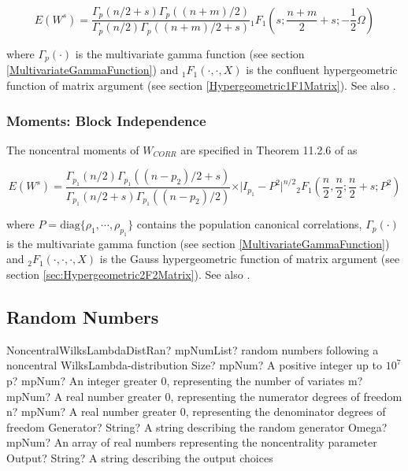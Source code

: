 \begin{equation}
	E(W^s) = \frac{\Gamma_p(n/2 + s)\Gamma_p((n + m)/2)}{\Gamma_p(n/2)\Gamma_p((n + m)/2 + s)} {}_1F_1\left(s ;\frac{n + m}{2}+ s ; -\frac{1}{2}\Omega\right)
\end{equation}

where $\Gamma_p(\cdot)$ is the multivariate gamma function (see section \ref{MultivariateGammaFunction}) and ${}_1F_1(\cdot,\cdot,X)$ is the confluent hypergeometric function of matrix argument (see section \ref{Hypergeometric1F1Matrix}). See also \cite{Butler_Wood_2002}.





\subsubsection{Moments: Block Independence}
The noncentral moments of $W_{CORR}$ are specified in Theorem 11.2.6 of \cite{Muirhead_1982} as

\begin{equation}
	E(W^s) = \frac{\Gamma_{p_1}(n/2)\Gamma_{p_1}((n - p_2)/2 + s)}{\Gamma_{p_1}(n/2+s)\Gamma_{p_1}((n-p_2)/2)} \times \vert I_{p_1}-P^2 \vert ^{n/2}  {}_2F_1\left(\frac{n}{2},\frac{n}{2} ;\frac{n}{2}+ s ; P^2\right)
\end{equation}

where $P = \text{diag} \{\rho_1, \cdots , \rho_{p_1} \}$ contains the population canonical correlations, $\Gamma_p(\cdot)$ is the multivariate gamma function (see section \ref{MultivariateGammaFunction}) and ${}_2F_1(\cdot,\cdot,\cdot,X)$ is the Gauss hypergeometric function of matrix argument (see section \ref{sec:Hypergeometric2F2Matrix}). See also \cite{Butler_Wood_2002}.





\subsection{Random Numbers}
\begin{mpFunctionsExtract}
	\mpFunctionSevenNotImplemented
	{NoncentralWilksLambdaDistRan? mpNumList? random numbers following a noncentral WilksLambda-distribution}
	{Size? mpNum? A positive integer up to $10^7$}
	{p? mpNum? An integer greater 0, representing the number of variates}
	{m? mpNum? A real number greater 0, representing the numerator  degrees of freedom}
	{n? mpNum? A real number greater 0, representing the denominator degrees of freedom}
	{Generator? String? A string describing the random generator}
	{Omega? mpNum? An array of real numbers representing the noncentrality parameter}
	{Output? String? A string describing the output choices}
\end{mpFunctionsExtract}

